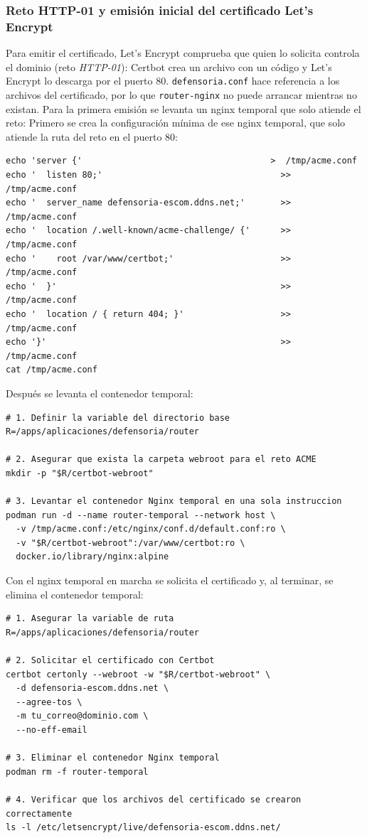 \subsubsection{Reto HTTP-01 y emisión inicial del certificado Let's Encrypt}
Para emitir el certificado, Let's Encrypt comprueba que quien lo solicita controla el dominio (reto \emph{HTTP-01}): Certbot crea un archivo con un código y Let's Encrypt lo descarga por el puerto 80. \texttt{defensoria.conf} hace referencia a los archivos del certificado, por lo que \texttt{router-nginx} no puede arrancar mientras no existan. Para la primera emisión se levanta un nginx temporal que solo atiende el reto:
Primero se crea la configuración mínima de ese nginx temporal, que solo atiende la ruta del reto en el puerto 80:
\begin{lstlisting}
echo 'server {'                                     >  /tmp/acme.conf
echo '  listen 80;'                                   >> /tmp/acme.conf
echo '  server_name defensoria-escom.ddns.net;'       >> /tmp/acme.conf
echo '  location /.well-known/acme-challenge/ {'      >> /tmp/acme.conf
echo '    root /var/www/certbot;'                     >> /tmp/acme.conf
echo '  }'                                            >> /tmp/acme.conf
echo '  location / { return 404; }'                   >> /tmp/acme.conf
echo '}'                                              >> /tmp/acme.conf
cat /tmp/acme.conf
\end{lstlisting}
Después se levanta el contenedor temporal:
\begin{lstlisting}
# 1. Definir la variable del directorio base
R=/apps/aplicaciones/defensoria/router

# 2. Asegurar que exista la carpeta webroot para el reto ACME
mkdir -p "$R/certbot-webroot"

# 3. Levantar el contenedor Nginx temporal en una sola instruccion
podman run -d --name router-temporal --network host \
  -v /tmp/acme.conf:/etc/nginx/conf.d/default.conf:ro \
  -v "$R/certbot-webroot":/var/www/certbot:ro \
  docker.io/library/nginx:alpine
\end{lstlisting}
Con el nginx temporal en marcha se solicita el certificado y, al terminar, se elimina el contenedor temporal:
\begin{lstlisting}
# 1. Asegurar la variable de ruta
R=/apps/aplicaciones/defensoria/router

# 2. Solicitar el certificado con Certbot
certbot certonly --webroot -w "$R/certbot-webroot" \
  -d defensoria-escom.ddns.net \
  --agree-tos \
  -m tu_correo@dominio.com \
  --no-eff-email

# 3. Eliminar el contenedor Nginx temporal
podman rm -f router-temporal

# 4. Verificar que los archivos del certificado se crearon correctamente
ls -l /etc/letsencrypt/live/defensoria-escom.ddns.net/
\end{lstlisting}
